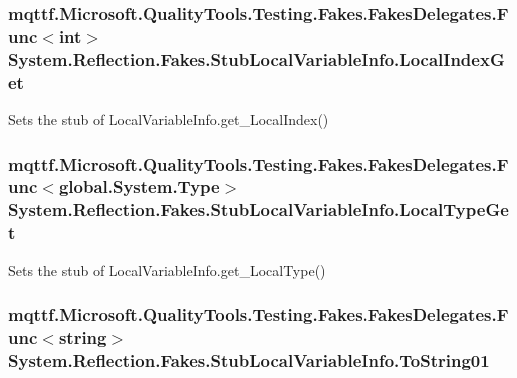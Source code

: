 \hypertarget{class_system_1_1_reflection_1_1_fakes_1_1_stub_local_variable_info_a040c2dbc50107b3d9dd43a4e79b48833}{
\subsubsection[{Local\-Index\-Get}]{\setlength{\rightskip}{0pt plus 5cm}mqttf.\-Microsoft.\-Quality\-Tools.\-Testing.\-Fakes.\-Fakes\-Delegates.\-Func$<$int$>$ System.\-Reflection.\-Fakes.\-Stub\-Local\-Variable\-Info.\-Local\-Index\-Get}}\label{class_system_1_1_reflection_1_1_fakes_1_1_stub_local_variable_info_a040c2dbc50107b3d9dd43a4e79b48833}


Sets the stub of Local\-Variable\-Info.\-get\-\_\-\-Local\-Index()

\hypertarget{class_system_1_1_reflection_1_1_fakes_1_1_stub_local_variable_info_aa4784f9b1ada359169579fe3a1798610}{
\subsubsection[{Local\-Type\-Get}]{\setlength{\rightskip}{0pt plus 5cm}mqttf.\-Microsoft.\-Quality\-Tools.\-Testing.\-Fakes.\-Fakes\-Delegates.\-Func$<$global.\-System.\-Type$>$ System.\-Reflection.\-Fakes.\-Stub\-Local\-Variable\-Info.\-Local\-Type\-Get}}\label{class_system_1_1_reflection_1_1_fakes_1_1_stub_local_variable_info_aa4784f9b1ada359169579fe3a1798610}


Sets the stub of Local\-Variable\-Info.\-get\-\_\-\-Local\-Type()

\hypertarget{class_system_1_1_reflection_1_1_fakes_1_1_stub_local_variable_info_aed034d75d2d7ce6047c8819c1d114913}{
\subsubsection[{To\-String01}]{\setlength{\rightskip}{0pt plus 5cm}mqttf.\-Microsoft.\-Quality\-Tools.\-Testing.\-Fakes.\-Fakes\-Delegates.\-Func$<$string$>$ System.\-Reflection.\-Fakes.\-Stub\-Local\-Variable\-Info.\-To\-String01}}\label{class_system_1_1_reflection_1_1_fakes_1_1_stub_local_variable_info_aed034d75d2d7ce6047c8819c1d114913}


